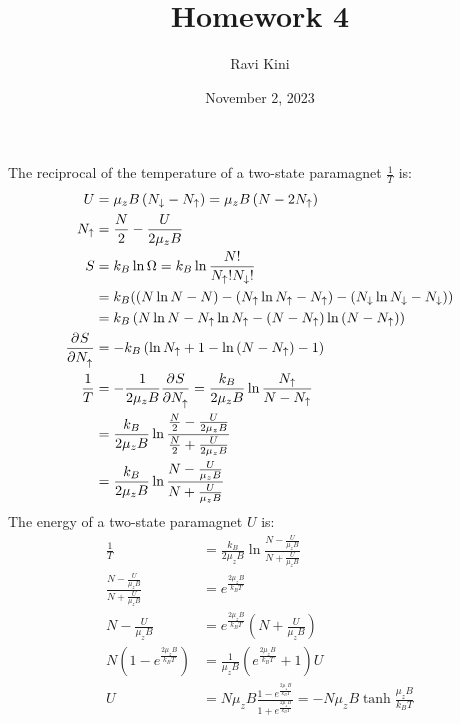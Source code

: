 \documentclass{article}
\title{Homework 4}
\author{Ravi Kini}
\date{November 2, 2023}
\begin{document}
\maketitle

The reciprocal of the temperature of a two-state paramagnet $\frac{1}{T}$ is:
\begin{equation}
    \begin{split}
        U & = \mu_z B\left(N_{\downarrow} - N_{\uparrow}\right) = \mu_z B\left(N - 2N_{\uparrow}\right) \\
        N_{\uparrow} & = \frac{N}{2} - \frac{U}{2\mu_z B} \\
        S & = k_B\ln\Omega = k_B\ln\frac{N!}{N_{\uparrow}!N_{\downarrow}!} \\
        & = k_B((N\ln N - N) - (N_{\uparrow}\ln N_{\uparrow} - N_{\uparrow}) - (N_{\downarrow}\ln N_{\downarrow} - N_{\downarrow})) \\
        & = k_B\left(N\ln N - N_{\uparrow}\ln N_{\uparrow} - (N - N_{\uparrow})\ln \left(N - N_{\uparrow}\right)\right) \\
        \frac{\partial^{}S} {\partial N_{\uparrow}^{}} & = -k_B\left(\ln N_{\uparrow} + 1 - \ln \left(N - N_{\uparrow}\right) - 1\right) \\
        \frac{1}{T} & = -\frac{1}{2\mu_z B}\frac{\partial^{}S} {\partial N_{\uparrow}^{}} = \frac{k_B}{2\mu_z B}\ln \frac{N_{\uparrow}}{N - N_{\uparrow}} \\
        & = \frac{k_B}{2\mu_z B}\ln \frac{\frac{N}{2} - \frac{U}{2\mu_z B}}{\frac{N}{2} + \frac{U}{2\mu_z B}} \\
        & = \frac{k_B}{2\mu_z B}\ln \frac{N - \frac{U}{\mu_z B}}{N + \frac{U}{\mu_z B}}
    \end{split}
\end{equation}
The energy of a two-state paramagnet $U$ is:
\begin{equation}
    \begin{split}
        \frac{1}{T} & = \frac{k_B}{2\mu_z B}\ln \frac{N - \frac{U}{\mu_z B}}{N + \frac{U}{\mu_z B}} \\
        \frac{N - \frac{U}{\mu_z B}}{N + \frac{U}{\mu_z B}} & = e^{\frac{2\mu_z B}{k_B T}} \\
        N - \frac{U}{\mu_z B} & = e^{\frac{2\mu_z B}{k_B T}}\left(N + \frac{U}{\mu_z B}\right) \\
        N\left(1 - e^{\frac{2\mu_z B}{k_B T}}\right) & = \frac{1}{\mu_z B}\left(e^{\frac{2\mu_z B}{k_B T}} + 1\right)U \\
        U & = N\mu_z B\frac{1 - e^{\frac{2\mu_z B}{k_B T}}}{1 + e^{\frac{2\mu_z B}{k_B T}}}  = -N\mu_z B\tanh\frac{\mu_z B}{k_B T}
    \end{split}
\end{equation}
\end{document}
